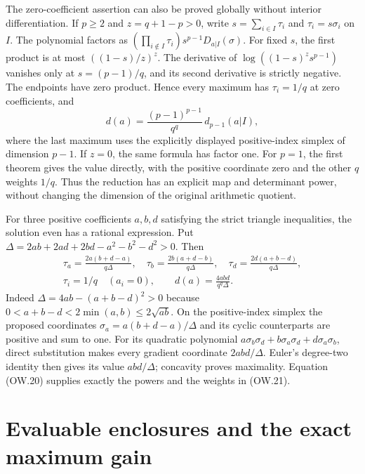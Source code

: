\documentclass[11pt]{article}
\begin{document}
The zero-coefficient assertion can also be proved globally without
interior differentiation. If $p\ge2$ and $z=q+1-p>0$, write
$s=\sum_{i\in I}\tau_i$ and $\tau_i=s\sigma_i$ on $I$.
The polynomial factors as
$(\prod_{i\notin I}\tau_i)s^{p-1}D_{a|I}(\sigma)$.
For fixed $s$, the first product is at most $((1-s)/z)^z$.
The derivative of $\log((1-s)^zs^{p-1})$ vanishes only at
$s=(p-1)/q$, and its second derivative is strictly negative.
The endpoints have zero product. Hence every maximum has
$\tau_i=1/q$ at zero coefficients, and
\[
 d(a)=\frac{(p-1)^{p-1}}{q^q}\,d_{p-1}(a|I),           \tag{OW.20}
\]
where the last maximum uses the explicitly displayed positive-index
simplex of dimension $p-1$. If $z=0$, the same formula has factor
one. For $p=1$, the first theorem gives the value directly, with
the positive coordinate zero and the other $q$ weights $1/q$.
Thus the reduction has an explicit map and determinant power,
without changing the dimension of the original arithmetic quotient.

For three positive coefficients $a,b,d$ satisfying the strict
triangle inequalities, the solution even has a rational expression.
Put $\Delta=2ab+2ad+2bd-a^2-b^2-d^2>0$. Then
\[
 \begin{gathered}
 \tau_a=\frac{2a(b+d-a)}{q\Delta},\quad
 \tau_b=\frac{2b(a+d-b)}{q\Delta},\quad
 \tau_d=\frac{2d(a+b-d)}{q\Delta},\\
 \tau_i=1/q\quad(a_i=0),\qquad
 \boxed{d(a)=\frac{4abd}{q^q\Delta}.}
 \end{gathered}                                           \tag{OW.21}
\]
Indeed $\Delta=4ab-(a+b-d)^2>0$ because
$0<a+b-d<2\min(a,b)\le2\sqrt{ab}$.
On the positive-index simplex the proposed coordinates
$\sigma_a=a(b+d-a)/\Delta$ and its cyclic counterparts are
positive and sum to one. For its quadratic polynomial
$a\sigma_b\sigma_d+b\sigma_a\sigma_d+d\sigma_a\sigma_b$,
direct substitution makes every gradient coordinate $2abd/\Delta$.
Euler's degree-two identity then gives its value $abd/\Delta$;
concavity proves maximality. Equation (OW.20) supplies exactly
the powers and the weights in (OW.21).

\section{Evaluable enclosures and the exact maximum gain}
\end{document}
